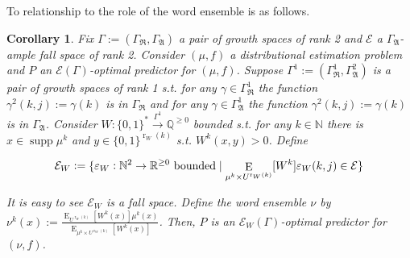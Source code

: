 \documentclass{article}
\numberwithin{equation}{section}
\theoremstyle{definition}
\theoremstyle{plain}
\newtheorem{corollary}{Corollary}[section]
\newcommand{\Words}{{\{ 0, 1 \}^*}}
\newcommand{\WordsLen}[1]{{\{ 0, 1 \}^{#1}}}
\DeclareMathOperator{\Supp}{supp}
\DeclareMathOperator{\E}{E}
\DeclareMathOperator{\R}{r}
\newcommand{\Nats}{\mathbb{N}}
\newcommand{\Rats}{\mathbb{Q}}
\newcommand{\Reals}{\mathbb{R}}
\begin{document}
To relationship to the role of the word ensemble is as follows.

\begin{samepage}
\begin{corollary}

Fix $\Gamma:=(\Gamma_{\mathfrak{R}},\Gamma_{\mathfrak{A}})$ a pair of growth spaces of rank 2 and $\mathcal{E}$ a $\Gamma_{\mathfrak{A}}$-ample fall space of rank 2. Consider $(\mu,f)$ a distributional estimation problem and $P$ an $\mathcal{E}(\Gamma)$-optimal predictor for $(\mu,f)$. Suppose $\Gamma^1:=(\Gamma_{\mathfrak{R}}^1,\Gamma_{\mathfrak{A}}^2)$ is a pair of growth spaces of rank 1 s.t. for any $\gamma \in \Gamma_{\mathfrak{R}}^1$ the function ${\gamma^2(k,j):=\gamma(k)}$ is in $\Gamma_{\mathfrak{R}}$ and for any $\gamma \in \Gamma_{\mathfrak{A}}^1$ the function $\gamma^2(k,j):=\gamma(k)$ is in $\Gamma_{\mathfrak{A}}$. Consider ${W: \Words \xrightarrow{\Gamma^1} \Rats^{\geq 0}}$ bounded s.t. for any $k \in \Nats$ there is $x \in \Supp \mu^k$ and $y \in \WordsLen{\R_W(k)}$ s.t. $W^k(x,y) > 0$. Define 

$${\mathcal{E}_W:=\{\varepsilon_W: \Nats^2 \rightarrow \Reals^{\geq 0} \textnormal{ bounded} \mid  \E_{\mu^k \times U^{\R_W(k)}}[W^k]\varepsilon_W(k,j) \in \mathcal{E}\}}$$

It is easy to see $\mathcal{E}_W$ is a fall space. Define the word ensemble $\nu$ by ${\nu^k(x):=\frac{\E_{U^{\R_W(k)}}[W^k(x)] \mu^k(x)}{\E_{\mu^k \times U^{\R_W(k)}}[W^k(x)]}}$. Then, $P$ is an $\mathcal{E}_W(\Gamma)$-optimal predictor for $(\nu,f)$.

\end{corollary}
\end{samepage}
\end{document}
